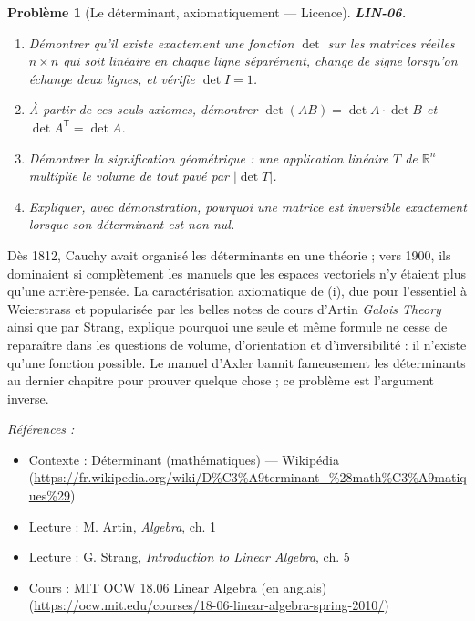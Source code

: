 \documentclass[11pt]{article}
\newtheorem{problem}{Problème}
\newenvironment{refs}{\par\small\noindent\emph{Références :}\begin{itemize}\setlength\itemsep{0pt}}{\end{itemize}\normalsize}
\begin{document}
\begin{problem}[{Le déterminant, axiomatiquement --- Licence}]
\textbf{LIN-06.} \begin{enumerate}
\item[(i)] Démontrer qu'il existe exactement une fonction $\det$ sur les
matrices réelles $n \times n$ qui soit linéaire en chaque ligne séparément, change de signe
lorsqu'on échange deux lignes, et vérifie $\det I = 1$.
\item[(ii)] À partir de ces seuls axiomes, démontrer
$\det(AB) = \det A \cdot \det B$ et $\det A^{\mathsf{T}} = \det A$.
\item[(iii)] Démontrer la
signification géométrique : une application linéaire $T$ de $\mathbb{R}^n$ multiplie le volume de
tout pavé par $|\det T|$.
\item[(iv)] Expliquer, avec démonstration, pourquoi une matrice est inversible exactement lorsque son
déterminant est non nul.
\end{enumerate}

\end{problem}

\noindent Dès 1812, Cauchy avait organisé les déterminants en une théorie ; vers 1900, ils
dominaient si complètement les manuels que les espaces vectoriels n'y étaient plus qu'une
arrière-pensée. La caractérisation axiomatique de (i), due pour l'essentiel à Weierstrass et
popularisée par les belles notes de cours d'Artin \textit{Galois Theory} ainsi que par Strang, explique
pourquoi une seule et même formule ne cesse de reparaître dans les questions de volume,
d'orientation et d'inversibilité : il n'existe qu'une fonction possible. Le manuel d'Axler bannit
fameusement les déterminants au dernier chapitre pour prouver quelque chose ; ce problème est
l'argument inverse.

\begin{refs}
\item Contexte : Déterminant (mathématiques) --- Wikipédia (\url{https://fr.wikipedia.org/wiki/D%C3%A9terminant_%28math%C3%A9matiques%29})
\item Lecture : M. Artin, \textit{Algebra}, ch. 1
\item Lecture : G. Strang, \textit{Introduction to Linear Algebra}, ch. 5
\item Cours : MIT OCW 18.06 Linear Algebra (en anglais) (\url{https://ocw.mit.edu/courses/18-06-linear-algebra-spring-2010/})
\end{refs}

\bigskip
\end{document}
